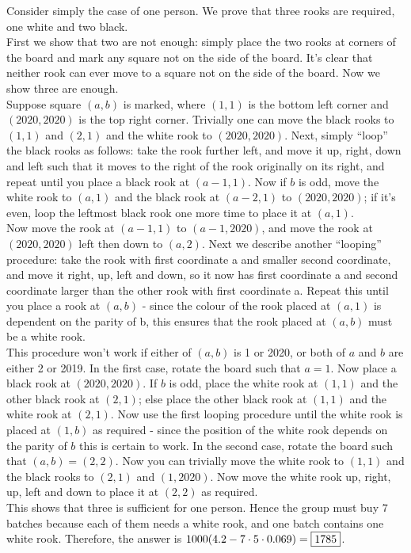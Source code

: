 \begin{solution} \hfil\medskip

    Consider simply the case of one person. We prove that three rooks are required, one white and two black.\\
    
    First we show that two are not enough: simply place the two rooks at corners of the board and mark any square not on the side of the board. It’s clear that neither rook can ever move to a square not on the side of the board. 
    Now we show three are enough.\\
    
    Suppose square \((a, b)\) is marked, where \((1, 1)\) is the bottom left corner and \((2020, 2020)\) is the top right corner.
    Trivially one can move the black rooks to \((1, 1)\) and \((2, 1)\) and the white rook to \((2020, 2020)\). 
    Next, simply “loop” the black rooks as follows: take the rook further left, and move it up, right, down and left such that it moves to the right of the rook originally on its right, and repeat until you place a black rook at \((a - 1, 1)\). Now if \(b\) is odd, move the white rook to \((a, 1)\) and the black rook at \((a - 2, 1)\) to \((2020, 2020)\); if it’s even, loop the leftmost black rook one more time to place it at \((a, 1)\).\\
    
    Now move the rook at \((a - 1, 1)\) to \((a - 1, 2020)\), and move the rook at \((2020, 2020)\) left then down to \((a, 2)\). Next we describe another “looping” procedure: take the rook with first coordinate a and smaller second coordinate, and move it right, up, left and down, so it now has first coordinate a and second coordinate larger than the other rook with first coordinate a. Repeat this until you place a rook at \((a, b)\) - since the colour of the rook placed at \((a, 1)\) is dependent on the parity of b, this ensures that the rook placed at \((a, b)\) must be a white rook.\\
    
    This procedure won’t work if either of \((a, b)\) is 1 or 2020, or both of \(a\) and \(b\) are either 2 or 2019. 
    In the first case, rotate the board such that \(a = 1\). Now place a black rook at \((2020, 2020)\). If \(b\) is odd, place the white rook at \((1, 1)\) and the other black rook at \((2, 1)\); else place the other black rook at \((1, 1)\) and the white rook at \((2, 1)\). Now use the first looping procedure until the white rook is placed at \((1, b)\) as required - since the position of the white rook depends on the parity of \(b\) this is certain to work. In the second case, rotate the board such that \((a, b) = (2, 2)\). Now you can trivially move the white rook to \((1, 1)\) and the black rooks to \((2, 1)\) and \((1, 2020)\). Now move the white rook up, right, up, left and down to place it at \((2, 2)\) as required.\\
    
    This shows that three is sufficient for one person. Hence the group must buy 7 batches because each of them needs a white rook, and one batch contains one white rook. Therefore, the answer is \(1000(4.2-7\cdot5\cdot0.069)=\fbox{1785}\).
\end{solution}